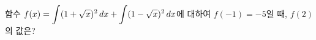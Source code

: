 함수 $f(x)=\displaystyle\int (1+\sqrt{x})^2\mkern3mu dx+\int (1-\sqrt{x})^2\mkern3mu dx$에 대하여 $f(-1)=-5$일 때, $f(2)$의 값은?
